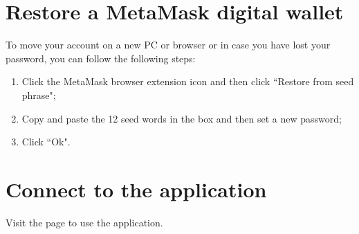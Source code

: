 \documentclass[ManualeUtente]{subfiles}
\begin{document}
\section{Restore a MetaMask digital wallet}
To move your account on a new PC or browser or in case you have lost your password, you can follow the following steps:
\begin{enumerate}
	\item Click the MetaMask browser extension icon and then click \textquotedblleft Restore from seed phrase";
	\item Copy and paste the 12 seed words in the box and then set a new password;
	\item Click \textquotedblleft Ok".
\end{enumerate}

\section{Connect to the application}
Visit the page  to use the application. %
\end{document}
